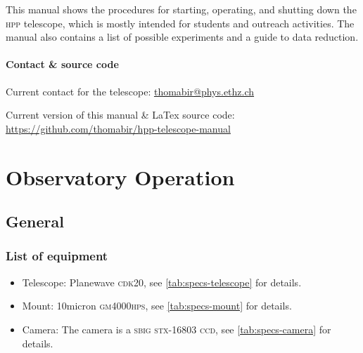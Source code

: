 \documentclass[a4paper, 11pt, fleqn]{memoir}
\begin{document}
This manual shows the procedures for starting, operating, and shutting down the \textsc{hpp} telescope, which is mostly intended for students and outreach activities.
The manual also contains a list of possible experiments and a guide to data reduction.

\subsection*{Contact \& source code}

Current contact for the telescope: \url{thomabir@phys.ethz.ch}

\noindent Current version of this manual \& LaTex source code: \url{https://github.com/thomabir/hpp-telescope-manual}

\cleardoublepage

\tableofcontents

\mainmatter

\part{Observatory Operation}

\chapter{General}

\section{List of equipment}

\begin{itemize}
    \item Telescope: Planewave \textsc{cdk20}, see \cref{tab:specs-telescope} for details.
    \item Mount: 10micron \textsc{gm4000hps}, see \cref{tab:specs-mount} for details.
    \item Camera: The camera is a \textsc{sbig stx-16803} \textsc{ccd}, see \cref{tab:specs-camera} for details.
\end{itemize}
\end{document}
